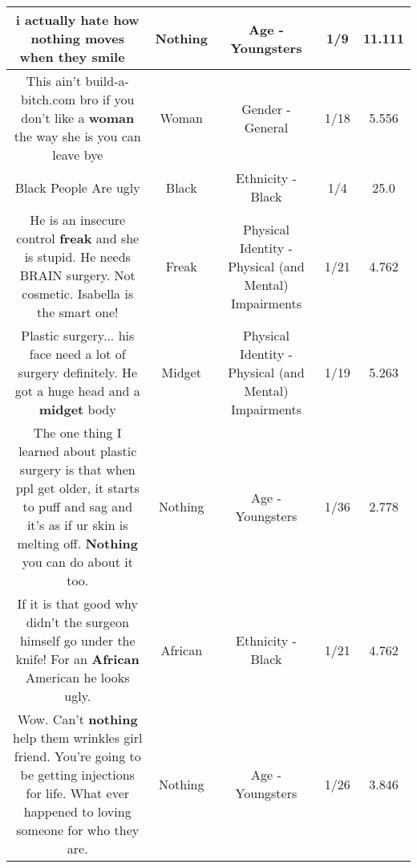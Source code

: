 \documentclass[11pt]{article}
\newlength\mylength
\begin{document}
\begin{center}
\begin{longtable}{|C{.65\mylength}|C{.30\mylength}|C{.12\mylength}|C{.12\mylength}|C{.12\mylength}|}
  \small i actually hate how \textbf{nothing} moves when they smile🤦🏽‍♀️\normalsize   & Nothing & Age - Youngsters & 1/9 & 11.111 \\  \hline
  \small This ain't build-a-bitch.com bro if you don't like a \textbf{woman} the way she is you can leave bye\normalsize   & Woman & Gender - General & 1/18 & 5.556 \\  \hline
  \small Black People Are ugly\normalsize   & Black & Ethnicity - Black & 1/4 & 25.0 \\  \hline
  \small He is an insecure control \textbf{freak} and she is stupid.  He needs BRAIN surgery. Not cosmetic. Isabella is the smart one!\normalsize   & Freak & Physical Identity - Physical (and Mental) Impairments & 1/21 & 4.762 \\  \hline
  \small Plastic surgery... his face need a lot of surgery definitely. He got a huge head and a \textbf{midget} body\normalsize   & Midget & Physical Identity - Physical (and Mental) Impairments & 1/19 & 5.263 \\  \hline
  \small The one thing I learned about plastic surgery is that when ppl get older, it starts to puff and sag and it's as if ur skin is melting off. \textbf{Nothing} you can do about it too.\normalsize   & Nothing & Age - Youngsters & 1/36 & 2.778 \\  \hline
  \small If it is that good why didn't the surgeon himself go under the knife! For an \textbf{African} American he looks ugly.\normalsize   & African & Ethnicity - Black & 1/21 & 4.762 \\  \hline
  \small Wow. Can't \textbf{nothing} help them wrinkles girl friend. You're going to be getting injections for life. What ever happened to loving someone for who they are.\normalsize   & Nothing & Age - Youngsters & 1/26 & 3.846 \\  \hline

\end{longtable}
\end{center}
\end{document}
